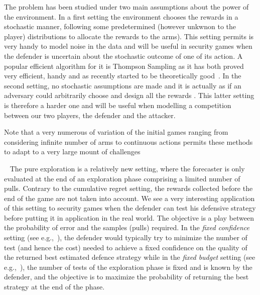 The problem has been studied under two main assumptions about the power of the environment. In a first setting  the environment chooses the rewards in a stochastic manner, following some predetermined (however unkwnon to the player) distributions to allocate the rewards to the arms). This setting permits is very handy to model noise in the data and will be useful in security games when the defender is uncertain about the stochastic outcome of one of its action. A popular efficient  algorithm for it is Thompson Sampling as it has both proved very efficient\cite{Chapelle11EE}, handy and as recently started to be theoretically good~\mbox{\cite{Kaufmann12TS}}. In the second setting, no stochastic assumptions are made and it is actually as if an adversary could arbitrarily choose and design all the rewards
\cite{Auer03NS}. This latter setting is therefore a harder one and will be useful when modelling a competition between our two players, the defender and the attacker.

Note that a very numerous of variation of the initial games ranging from considering  infinite number of arms to continuous actions\cite{Wang08AI,Abbasi-Yadkori11IA,Dani07TP} permits these methods to adapt to a very large mount of challenges

\textbullet~ The pure exploration is a relatively new setting, where the forecaster is only evaluated at the end of an exploration phase comprising a limited number of pulls. Contrary to the cumulative regret setting, the rewards collected before the end of the game are not taken into account.  We see a very interesting application of this setting to security games when the defender can test his defensive strategy before putting it in application in the real world.
The objective is a play between the probability of error and the samples (pulls) required. 
In the \textit{fixed confidence} setting (see e.g.,~\cite{Maron93HR,Even-Dar06AE}), the defender would typically try to minimize the number of test (and hence the cost) needed to achieve a fixed confidence on the quality of the returned best estimated defence strategy while in the \textit{fixed budget} setting (see e.g.,~\cite{Bubeck09PE,Audibert10BA}), the number of tests of the exploration phase is fixed and is known by the defender, and the objective is to maximize the probability of returning the best strategy at the end of the phase. 


